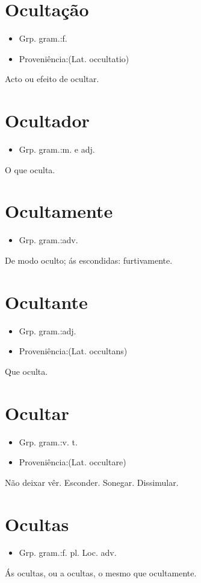 \section{Ocultação}
\begin{itemize}
\item {Grp. gram.:f.}
\end{itemize}
\begin{itemize}
\item {Proveniência:(Lat. \textunderscore occultatio\textunderscore )}
\end{itemize}
Acto ou efeito de ocultar.
\section{Ocultador}
\begin{itemize}
\item {Grp. gram.:m.  e  adj.}
\end{itemize}
O que oculta.
\section{Ocultamente}
\begin{itemize}
\item {Grp. gram.:adv.}
\end{itemize}
De modo oculto; ás escondidas: furtivamente.
\section{Ocultante}
\begin{itemize}
\item {Grp. gram.:adj.}
\end{itemize}
\begin{itemize}
\item {Proveniência:(Lat. \textunderscore occultans\textunderscore )}
\end{itemize}
Que oculta.
\section{Ocultar}
\begin{itemize}
\item {Grp. gram.:v. t.}
\end{itemize}
\begin{itemize}
\item {Proveniência:(Lat. \textunderscore occultare\textunderscore )}
\end{itemize}
Não deixar vêr.
Esconder.
Sonegar.
Dissimular.
\section{Ocultas}
\begin{itemize}
\item {Grp. gram.:f. pl. Loc. adv.}
\end{itemize}
\textunderscore Ás ocultas\textunderscore , ou \textunderscore a ocultas\textunderscore , o mesmo que \textunderscore ocultamente\textunderscore .
